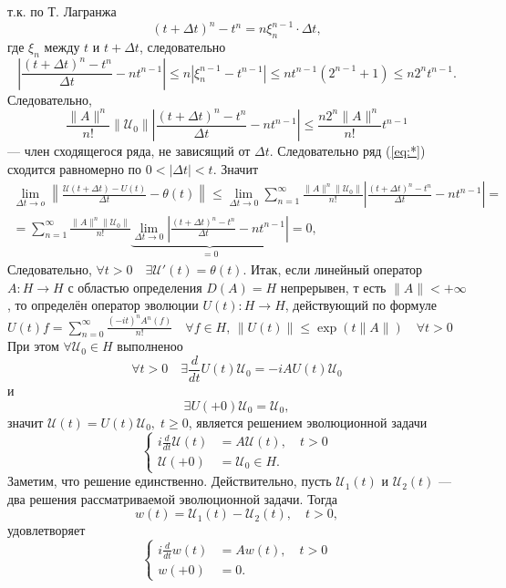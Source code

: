 т.\:к. по Т. Лагранжа
\[
	(t+\Delta t)^n -t^n= n \xi_n ^{n-1} \cdot \Delta t,
\]
где $\xi_n$ между $t$ и $t+\Delta t$, следовательно
\[
	\left| \frac{(t +\Delta t)^n -t^n}{\Delta t}- n t ^{n-1} \right| \le  n \left| \xi_n ^{n-1}-t ^{n-1} \right| \le 
	n t ^{n-1}(2 ^{n-1}+1)\le n 2^n t ^{n-1}
.\] 
Следовательно,
\[
	\frac{\| A\|^n}{n!}\| \mathcal{U}_0\| \left| \frac{\left( t +\Delta t \right) ^n -t^n}{\Delta t}-n t ^{n-1} \right| \le 
	\frac{n 2^n \| A\|^n}{n!}t ^{n-1}
\]
--- член сходящегося ряда, не зависящий от $\Delta t$. Следовательно
ряд (\ref{eq:*}) сходится равномерно по $0 < |\Delta t| <t$. Значит
\begin{multline*}
	\lim_{\Delta t \to o} \left\lVert \frac{\mathcal{U}(t+\Delta t)-U(t)}{\Delta t}-\theta (t)\right\rVert\le \lim_{\Delta t \to 0} 
	\sum_{n=1}^{\infty} \frac{\| A\|^n \| \mathcal{U}_0\|}{n!}
	\left| \frac{(t+\Delta t)^n -t ^n}{\Delta t}- n t ^{n-1} \right| =\\= \sum_{n=1}^{\infty} \frac{\| A\|^n \| \mathcal{U}_0\|}{n!}
	\underbrace{\lim_{\Delta t \to 0} \left| \frac{(t+\Delta t)^n-t^n}{\Delta t}- n t ^{n-1} \right| }_{=0}=0
 ,\end{multline*} 
 Следовательно, $\forall t >0 \quad \exists \mathcal{U}'(t)=\theta(t)$.
 Итак, если линейный оператор  $A: H\to H$ с областью определения
 $D(A) = H$ непрерывен, т есть $\| A\|< +\infty$, то определён
 оператор эволюции $U(t): H\to H$, действующий по формуле
 $U(t)f = \sum_{n=0}^{\infty} \frac{(-it)^n A^n(f)}{n!} \quad \forall
 f \in  H,\, \| U(t)\|\le \exp\left( t \| A\| \right) \quad \forall
 t >0$ 
 При этом $\forall \mathcal{U}_0 \in H$ выполненоо
 \[
	 \forall t>0 \quad \exists \frac{d}{dt}U(t) \mathcal{U}_0=-i A
	 U(t) \mathcal{U}_0
 \]
 и
 \[
	 \exists U(+0)\mathcal{U}_0=\mathcal{U}_0
  ,\] 
  значит $\mathcal{U}(t)=U(t)\mathcal{U}_0,\; t\ge 0$, является решением эволюционной задачи
\[
\left\{
\begin{aligned}
	i \frac{d}{dt} \mathcal{U}(t) &= A \mathcal{U}(t),\quad t>0\\
	\mathcal{U}(+0)&=\mathcal{U}_0 \in H.
\end{aligned}
\right.
\] 
Заметим, что решение единственно. Действительно, пусть $\mathcal{U}_1 (t)$ и $\mathcal{U}_2(t)$ --- два решения рассматриваемой
эволюционной задачи. Тогда
\[
	w(t) = \mathcal{U}_1(t)-\mathcal{U}_2(t), \quad t>0,
\]
удовлетворяет
\[
\left\{
\begin{aligned}
	i \frac{d}{dt} w (t) &= A w(t),\quad t>0\\
	w(+0)&=0.
\end{aligned}
\right.
\] 
